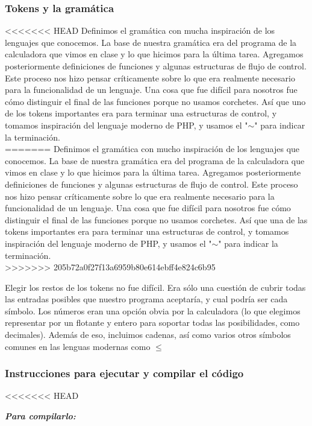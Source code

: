 \documentclass[12pt]{article}
\begin{document}
\subsubsection*{Tokens y la gramática}
<<<<<<< HEAD
Definimos el gramática con mucha inspiración de los lenguajes que conocemos. La base de nuestra gramática era del programa de la calculadora que vimos en clase y lo que hicimos para la última tarea. Agregamos posteriormente definiciones de funciones y algunas estructuras de flujo de control. Este proceso nos hizo pensar críticamente sobre lo que era realmente necesario para la funcionalidad de un lenguaje. Una cosa que fue difícil para nosotros fue cómo distinguir el final de las funciones porque no usamos corchetes. Así que uno de los tokens importantes era para terminar una estructuras de control, y tomamos inspiración del lenguaje moderno de PHP, y usamos el "$\sim$" para indicar la terminación. \\
=======
Definimos el gramática con mucho inspiración de los lenguajes que conocemos. La base de nuestra gramática era del programa de la calculadora que vimos en clase y lo que hicimos para la última tarea. Agregamos posteriormente definiciones de funciones y algunas estructuras de flujo de control. Este proceso nos hizo pensar críticamente sobre lo que era realmente necesario para la funcionalidad de un lenguaje. Una cosa que fue difícil para nosotros fue cómo distinguir el final de las funciones porque no usamos corchetes. Así que una de las tokens importantes era para terminar una estructuras de control, y tomamos inspiración del lenguaje moderno de PHP, y usamos el "$\sim$" para indicar la terminación. \\
>>>>>>> 205b72a0f27f13a6959b80e614ebff4e824c6b95

Elegir los restos de los tokens no fue difícil. Era sólo una cuestión de cubrir todas las entradas posibles que nuestro programa aceptaría, y cual podría ser cada símbolo. Los números eran una opción obvia por la calculadora (lo que elegimos representar por un flotante y entero para soportar todas las posibilidades, como decimales). Además de eso, incluimos cadenas, así como varios otros símbolos comunes en las lenguas modernas como $\leq$

\subsubsection*{Instrucciones para ejecutar y compilar el código}
<<<<<<< HEAD

\textbf{\textit{Para compilarlo:}}\\
\end{document}
